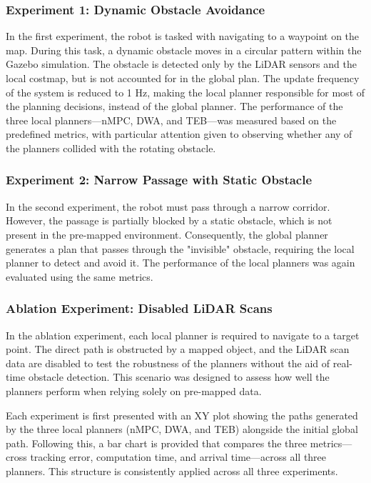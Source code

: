 \documentclass[conference]{IEEEtran}
\begin{document}
\subsubsection{Experiment 1: Dynamic Obstacle Avoidance}

In the first experiment, the robot is tasked with navigating to a waypoint on the map. During this task, a dynamic obstacle moves in a circular pattern within the Gazebo simulation. The obstacle is detected only by the LiDAR sensors and the local costmap, but is not accounted for in the global plan. The update frequency of the system is reduced to 1 Hz, making the local planner responsible for most of the planning decisions, instead of the global planner. The performance of the three local planners—nMPC, DWA, and TEB—was measured based on the predefined metrics, with particular attention given to observing whether any of the planners collided with the rotating obstacle.

\subsubsection{Experiment 2: Narrow Passage with Static Obstacle}

In the second experiment, the robot must pass through a narrow corridor. However, the passage is partially blocked by a static obstacle, which is not present in the pre-mapped environment. Consequently, the global planner generates a plan that passes through the "invisible" obstacle, requiring the local planner to detect and avoid it. The performance of the local planners was again evaluated using the same metrics.

\subsubsection{Ablation Experiment: Disabled LiDAR Scans}

In the ablation experiment, each local planner is required to navigate to a target point. The direct path is obstructed by a mapped object, and the LiDAR scan data are disabled to test the robustness of the planners without the aid of real-time obstacle detection. This scenario was designed to assess how well the planners perform when relying solely on pre-mapped data.


Each experiment is first presented with an XY plot showing the paths generated by the three local planners (nMPC, DWA, and TEB) alongside the initial global path. Following this, a bar chart is provided that compares the three metrics—cross tracking error, computation time, and arrival time—across all three planners. This structure is consistently applied across all three experiments.
\end{document}
